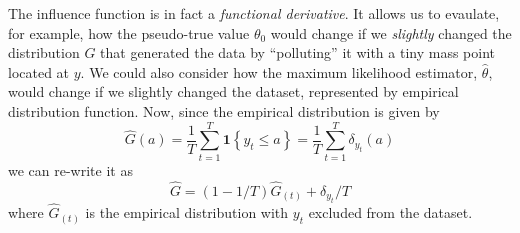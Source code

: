 \documentclass[12pt]{article}
\theoremstyle{definition}
\begin{document}
The influence function is in fact a \emph{functional derivative}. It allows us to evaulate, for example, how the pseudo-true value $\theta_0$  would change if we \emph{slightly} changed the distribution $G$ that generated the data by ``polluting'' it with a tiny mass point located at $y$. We could also consider how the maximum likelihood estimator, $\widehat{\theta}$, would change if we slightly changed the dataset, represented by empirical distribution function. 
Now, since the empirical distribution is given by
$$\widehat{G}(a) = \frac{1}{T}\sum_{t=1}^T \textbf{1}\left\{y_t \leq a\right\} = \frac{1}{T}\sum_{t=1}^T \delta_{y_t}(a)$$
we can re-write it as 
$$\widehat{G} = (1 - 1/T) \widehat{G}_{(t)} + \delta_{y_t}/T$$
where $\widehat{G}_{(t)}$ is the empirical distribution with $y_t$ excluded from the dataset. 
\end{document}
